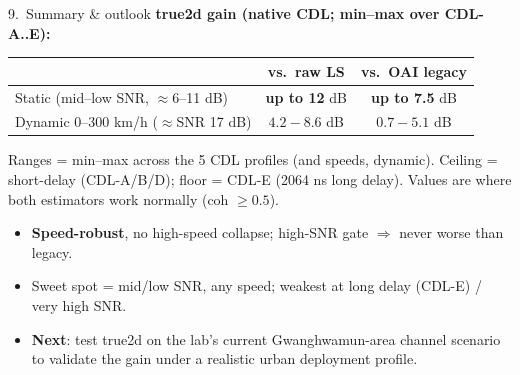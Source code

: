 \documentclass[aspectratio=169,10pt]{beamer}
\begin{document}
\begin{frame}{9.\ Summary \& outlook}
\textbf{true2d gain (native CDL; min--max over CDL-A..E):}
\begin{center}\small
\begin{tabular}{lcc}
\toprule
 & vs.\ raw LS & vs.\ OAI legacy \\
\midrule
Static (mid--low SNR, $\approx$6--11 dB) & \textbf{up to 12} dB & \textbf{up to 7.5} dB \\
Dynamic 0--300 km/h ($\approx$SNR 17 dB) & $4.2\!-\!8.6$ dB & $0.7\!-\!5.1$ dB \\
\bottomrule
\end{tabular}
\end{center}
{\scriptsize Ranges = min--max across the 5 CDL profiles (and speeds, dynamic). Ceiling = short-delay (CDL-A/B/D); floor = CDL-E (2064 ns long delay). Values are where both estimators work normally (coh $\geq 0.5$).}
\vspace{2mm}
\begin{itemize}
  \item \textbf{Speed-robust}, no high-speed collapse; high-SNR gate $\Rightarrow$ never worse than legacy.
  \item Sweet spot = mid/low SNR, any speed; weakest at long delay (CDL-E) / very high SNR.
  \item \textbf{Next}: test true2d on the lab's current Gwanghwamun-area channel scenario to validate the gain under a realistic urban deployment profile.
\end{itemize}
\end{frame}
\end{document}
